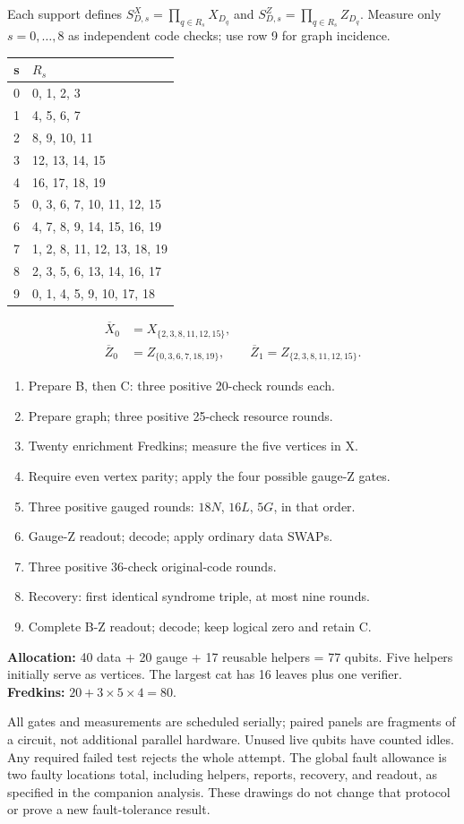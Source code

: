 \documentclass[11pt]{article}
\newcommand{\subhead}[1]{\par\vspace{3mm}{\bfseries\color{ink}#1}\par}
\begin{document}
Each support defines $S^X_{D,s}=\prod_{q\in R_s}X_{D_q}$ and
$S^Z_{D,s}=\prod_{q\in R_s}Z_{D_q}$. Measure only $s=0,\ldots,8$
as independent code checks; use row 9 for graph incidence.
\begin{center}\begin{tabular}{cl}\toprule
s & $R_s$\\\midrule
0 & 0, 1, 2, 3 \\
1 & 4, 5, 6, 7 \\
2 & 8, 9, 10, 11 \\
3 & 12, 13, 14, 15 \\
4 & 16, 17, 18, 19 \\
5 & 0, 3, 6, 7, 10, 11, 12, 15 \\
6 & 4, 7, 8, 9, 14, 15, 16, 19 \\
7 & 1, 2, 8, 11, 12, 13, 18, 19 \\
8 & 2, 3, 5, 6, 13, 14, 16, 17 \\
9 & 0, 1, 4, 5, 9, 10, 17, 18 \\
\bottomrule\end{tabular}\end{center}
\[
\begin{aligned}
\overline X_0&=X_{\{2,3,8,11,12,15\}},\\
\overline Z_0&=Z_{\{0,3,6,7,18,19\}},\qquad
\overline Z_1=Z_{\{2,3,8,11,12,15\}}.
\end{aligned}
\]
\subhead{One attempt, in execution order}
\begin{enumerate}\setlength\itemsep{1pt}
\item Prepare B, then C: three positive 20-check rounds each.
\item Prepare graph; three positive 25-check resource rounds.
\item Twenty enrichment Fredkins; measure the five vertices in X.
\item Require even vertex parity; apply the four possible gauge-Z gates.
\item Three positive gauged rounds: $18N$, $16L$, $5G$, in that order.
\item Gauge-Z readout; decode; apply ordinary data SWAPs.
\item Three positive 36-check original-code rounds.
\item Recovery: first identical syndrome triple, at most nine rounds.
\item Complete B-Z readout; decode; keep logical zero and retain C.
\end{enumerate}
\textbf{Allocation:} 40 data + 20 gauge + 17 reusable helpers = 77 qubits.
Five helpers initially serve as vertices. The largest cat has 16 leaves
plus one verifier. \textbf{Fredkins:} $20+3\times5\times4=80$.
\medskip

All gates and measurements are scheduled serially; paired panels are
fragments of a circuit, not additional parallel hardware. Unused live
qubits have counted idles. Any required failed test rejects the whole
attempt. The global fault allowance is two faulty locations total,
including helpers, reports, recovery, and readout, as specified in the
companion analysis. These drawings do not change that protocol or prove
a new fault-tolerance result.
\end{document}
